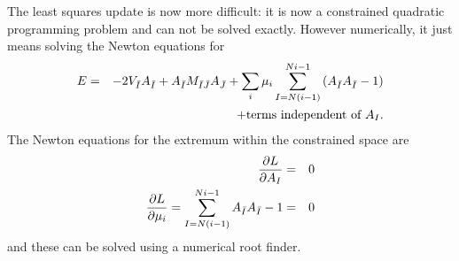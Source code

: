 \documentclass[11pt,twocolumn]{IEEEtran}
\begin{document}
The least squares update is now more difficult: it is now a constrained
quadratic programming problem and can not be solved exactly. However
numerically, it just means solving the Newton equations for
\begin{eqnarray}
E&=&-2V_{\bar{I}} A_{\bar{I}}+A_{\bar{I}}M_{\bar{I}\bar{J}}A_{\bar{J}}+\sum_{i}{\mu_i\sum_{I=N(i-1)}^{Ni-1}{\left(A_{\bar{I}} A_{\bar{I}}-1\right)}}\cr
&&+\mbox{terms independent of }A_I.
\end{eqnarray}
The Newton equations for the extremum within the constrained space are
\begin{eqnarray}\label{Neqn}
\frac{\partial L}{\partial A_I}&=&0\cr
\frac{\partial L}{\partial \mu_i}=\sum_{I=N(i-1)}^{Ni-1}{A_{\bar{I}} A_{\bar{I}}}-1&=&0
\end{eqnarray}
and these can be solved using a numerical root finder.
\end{document}
